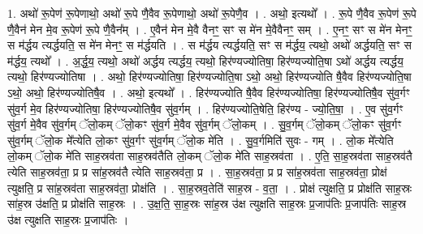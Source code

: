 \documentclass[17pt]{extarticle}
\begin{document}
1. अथो॑ रू॒पेण॑ रू॒पेणाथो॒ अथो॑ रू॒पे णै॒वैव रू॒पेणाथो॒ अथो॑ रू॒पेणै॒व । . अथो॒ इत्यथो᳚ । . रू॒पे णै॒वैव रू॒पेण॑ रू॒पे णै॒वैन॑ मेन मे॒व रू॒पेण॑ रू॒पे णै॒वैन᳚म् । . ए॒वैन॑ मेन मे॒वै वैनꣳ॒॒ सꣳ स मे॑न मे॒वैवैनꣳ॒॒ सम् । . ए॒नꣳ॒॒ सꣳ स मे॑न मेनꣳ॒॒ स म॑र्द्धय त्यर्द्धयति॒ स मे॑न मेनꣳ॒॒ स म॑र्द्धयति । . स म॑र्द्धय त्यर्द्धयति॒ सꣳ स म॑र्द्धय॒ त्यथो॒ अथो॑ अर्द्धयति॒ सꣳ स म॑र्द्धय॒ त्यथो᳚ । . अ॒र्द्ध॒य॒ त्यथो॒ अथो॑ अर्द्धय त्यर्द्धय॒ त्यथो॒ हिर॑ण्यज्योतिषा॒ हिर॑ण्यज्योति॒षा ऽथो॑ अर्द्धय त्यर्द्धय॒ त्यथो॒ हिर॑ण्यज्योतिषा । . अथो॒ हिर॑ण्यज्योतिषा॒ हिर॑ण्यज्योति॒षा ऽथो॒ अथो॒ हिर॑ण्यज्योति षै॒वैव हिर॑ण्यज्योति॒षा ऽथो॒ अथो॒ हिर॑ण्यज्योतिषै॒व । . अथो॒ इत्यथो᳚ । . हिर॑ण्यज्योति षै॒वैव हिर॑ण्यज्योतिषा॒ हिर॑ण्यज्योतिषै॒व सु॑व॒र्गꣳ सु॑व॒र्ग मे॒व हिर॑ण्यज्योतिषा॒ हिर॑ण्यज्योतिषै॒व सु॑व॒र्गम् । . हिर॑ण्यज्योति॒षेति॒ हिर॑ण्य - ज्यो॒ति॒षा॒ । . ए॒व सु॑व॒र्गꣳ सु॑व॒र्ग मे॒वैव सु॑व॒र्गम् ॅलो॒कम् ॅलो॒कꣳ सु॑व॒र्ग मे॒वैव सु॑व॒र्गम् ॅलो॒कम् । . सु॒व॒र्गम् ॅलो॒कम् ॅलो॒कꣳ सु॑व॒र्गꣳ सु॑व॒र्गम् ॅलो॒क मे᳚त्येति लो॒कꣳ सु॑व॒र्गꣳ सु॑व॒र्गम् ॅलो॒क मे॑ति । . सु॒व॒र्गमिति॑ सुवः - गम् । . लो॒क मे᳚त्येति लो॒कम् ॅलो॒क मे॑ति साह॒स्रव॑ता साह॒स्रव॑तैति लो॒कम् ॅलो॒क मे॑ति साह॒स्रव॑ता । . ए॒ति॒ सा॒ह॒स्रव॑ता साह॒स्रव॑तै त्येति साह॒स्रव॑ता॒ प्र प्र सा॑ह॒स्रव॑तै त्येति साह॒स्रव॑ता॒ प्र । . सा॒ह॒स्रव॑ता॒ प्र प्र सा॑ह॒स्रव॑ता साह॒स्रव॑ता॒ प्रोक्ष॑ त्युक्षति॒ प्र सा॑ह॒स्रव॑ता साह॒स्रव॑ता॒ प्रोक्ष॑ति । . सा॒ह॒स्रव॒तेति॑ साह॒स्र - व॒ता॒ । . प्रोक्ष॑ त्युक्षति॒ प्र प्रोक्ष॑ति साह॒स्रः सा॑ह॒स्र उ॑क्षति॒ प्र प्रोक्ष॑ति साह॒स्रः । . उ॒क्ष॒ति॒ सा॒ह॒स्रः सा॑ह॒स्र उ॑क्ष त्युक्षति साह॒स्रः प्र॒जाप॑तिः प्र॒जाप॑तिः साह॒स्र उ॑क्ष त्युक्षति साह॒स्रः प्र॒जाप॑तिः । \newline
\end{document}

